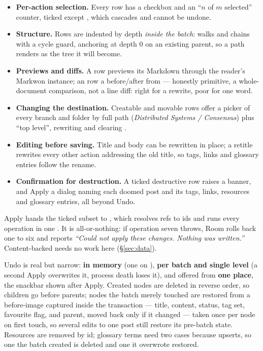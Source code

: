 \begin{itemize}
  \item \textbf{Per-action selection.} Every row has a checkbox and an ``$n$ of $m$ selected'' counter,
        ticked except , which cascades and cannot be undone.
  \item \textbf{Structure.} Rows are indented by depth \emph{inside the batch}: 
        walks  and  chains with a cycle guard, anchoring at depth 0 on an
        existing parent, so a path renders as the tree it will become.
  \item \textbf{Previews and diffs.} A  row previews its Markdown through the reader's
        Markwon instance; an  row a before/after from  --- honestly
        primitive, a whole-document comparison, not a line diff: right for a rewrite, poor for one word.
  \item \textbf{Changing the destination.} Creatable and movable rows offer a picker of every branch and
        folder by full path (\emph{Distributed Systems / Consensus}) plus ``top level'', rewriting
         and clearing .
  \item \textbf{Editing before saving.} Title and body can be rewritten in place; a retitle rewrites every
        other action addressing the old title, so tags, links and glossary entries follow the rename.
  \item \textbf{Confirmation for destruction.} A ticked destructive row raises a banner, and Apply a dialog
        naming each doomed post and its tags, links, resources and glossary entries, all beyond Undo.
\end{itemize}

Apply hands the ticked subset to , which resolves refs to ids and runs every operation
in one . It is all-or-nothing: if operation seven throws, Room rolls back one to
six and reports \emph{``Could not apply these changes. Nothing was written.''} Content-backed
 needs no work here (\S\ref{sec:data}).

Undo is real but narrow: \textbf{in memory} (one   on
), \textbf{per batch and single level} (a second Apply overwrites it, process death
loses it), and offered from \textbf{one place}, the snackbar shown after Apply. Created nodes are deleted in
reverse order, so children go before parents; nodes the batch merely touched are restored from a
before-image captured inside the transaction --- title, content, status, tag set, favourite flag, and
parent, moved back only if it changed --- taken once per node on first touch, so several edits to one post
still restore its pre-batch state. Resources are removed by id; glossary terms need two cases because
 upserts, so one the batch created is deleted and one it overwrote restored.

